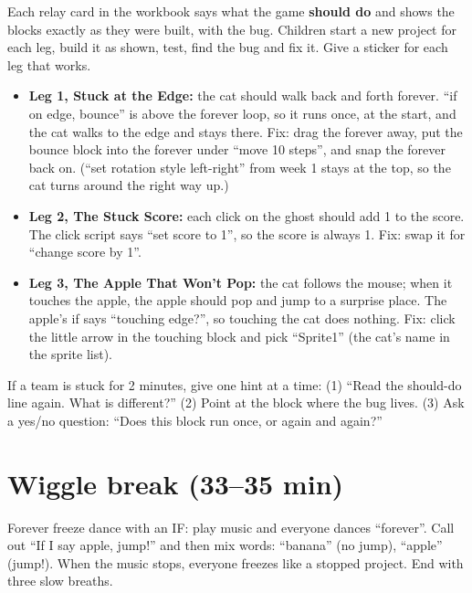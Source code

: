 \begin{bughunt}
Each relay card in the workbook says what the game \textbf{should do} and shows the blocks exactly as they were built, with the bug. Children start a new project for each leg, build it as shown, test, find the bug and fix it. Give a sticker for each leg that works.
\begin{itemize}[leftmargin=1.2em,itemsep=1pt]
  \item \textbf{Leg 1, Stuck at the Edge:} the cat should walk back and forth forever. \enquote{if on edge, bounce} is above the forever loop, so it runs once, at the start, and the cat walks to the edge and stays there. Fix: drag the forever away, put the bounce block into the forever under \enquote{move 10 steps}, and snap the forever back on. (\enquote{set rotation style left-right} from week 1 stays at the top, so the cat turns around the right way up.)
  \item \textbf{Leg 2, The Stuck Score:} each click on the ghost should add 1 to the score. The click script says \enquote{set score to 1}, so the score is always 1. Fix: swap it for \enquote{change score by 1}.
  \item \textbf{Leg 3, The Apple That Won't Pop:} the cat follows the mouse; when it touches the apple, the apple should pop and jump to a surprise place. The apple's if says \enquote{touching edge?}, so touching the cat does nothing. Fix: click the little arrow in the touching block and pick \enquote{Sprite1} (the cat's name in the sprite list).
\end{itemize}
If a team is stuck for 2 minutes, give one hint at a time: (1) \enquote{Read the should-do line again. What is different?} (2) Point at the block where the bug lives. (3) Ask a yes/no question: \enquote{Does this block run once, or again and again?}
\end{bughunt}

\section{Wiggle break (33--35 min)}
Forever freeze dance with an IF: play music and everyone dances \enquote{forever}. Call out \enquote{If I say apple, jump!} and then mix words: \enquote{banana} (no jump), \enquote{apple} (jump!). When the music stops, everyone freezes like a stopped project. End with three slow breaths.

